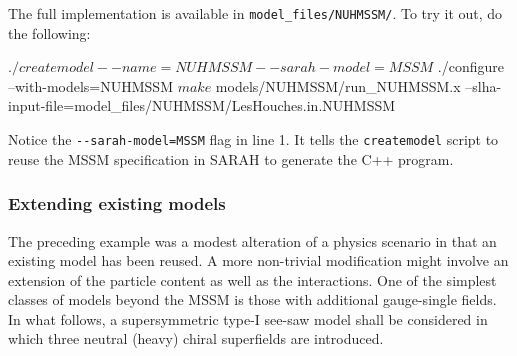 \documentclass[final,3p,11pt,pdflatex]{elsarticle}
\makeatletter
\newcommand{\sarah}{SARAH\@\xspace}
\newcommand{\code}[1]{\lstinline|#1|}  %
\makeatother
\begin{document}
The full implementation is available
in \code{model_files/NUHMSSM/}.
To try it out, do the following:
\begin{numlstlisting}[language=bash]
$ ./createmodel --name=NUHMSSM --sarah-model=MSSM
$ ./configure --with-models=NUHMSSM
$ make
$ models/NUHMSSM/run_NUHMSSM.x --slha-input-file=model_files/NUHMSSM/LesHouches.in.NUHMSSM
\end{numlstlisting}
Notice the \code{--sarah-model=MSSM} flag in line 1.
It tells the \code{createmodel} script to reuse
the MSSM specification in \sarah
to generate the C++ program.

\subsubsection{Extending existing models}

The preceding example was a modest alteration of a physics scenario
in that an existing model has been reused.
A more non-trivial modification might involve
an extension of the particle content as well as the interactions.
One of the simplest classes of models beyond the MSSM is
those with additional gauge-single fields.
In what follows, a supersymmetric type-I see-saw model
\cite{see-saw}
shall be considered in which
three neutral (heavy) chiral superfields are introduced.
\end{document}
